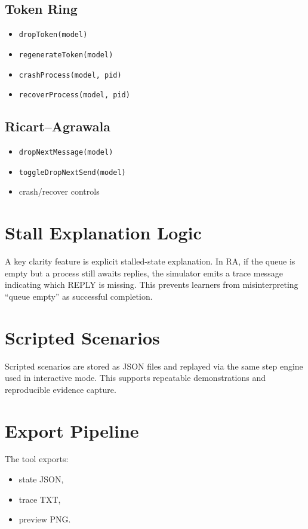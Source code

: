 \subsection{Token Ring}
\begin{itemize}
  \item \texttt{dropToken(model)}
  \item \texttt{regenerateToken(model)}
  \item \texttt{crashProcess(model, pid)}
  \item \texttt{recoverProcess(model, pid)}
\end{itemize}

\subsection{Ricart--Agrawala}
\begin{itemize}
  \item \texttt{dropNextMessage(model)}
  \item \texttt{toggleDropNextSend(model)}
  \item crash/recover controls
\end{itemize}

\section{Stall Explanation Logic}
A key clarity feature is explicit stalled-state explanation. In RA, if the queue is empty but a process still awaits replies, the simulator emits a trace message indicating which REPLY is missing. This prevents learners from misinterpreting ``queue empty'' as successful completion.

\section{Scripted Scenarios}
Scripted scenarios are stored as JSON files and replayed via the same step engine used in interactive mode. This supports repeatable demonstrations and reproducible evidence capture.

\section{Export Pipeline}
The tool exports:
\begin{itemize}
  \item state JSON,
  \item trace TXT,
  \item preview PNG.
\end{itemize}

